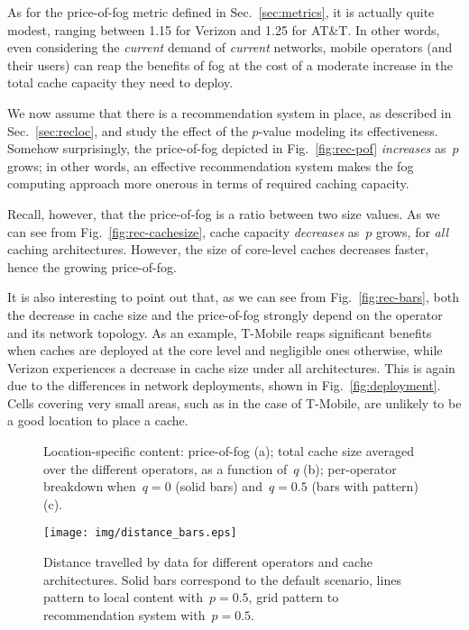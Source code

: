 \documentclass{sig-alternate-05-2015}
\newcommand{\Fig}[1]{Fig.~\ref{fig:#1}}
\newcommand{\Sec}[1]{Sec.~\ref{sec:#1}}
\begin{document}
As for the price-of-fog metric defined in \Sec{metrics}, it is actually quite modest, ranging between 1.15 for Verizon and 1.25 for AT\&T. In other words, even considering the {\em current} demand of {\em current} networks, mobile operators (and their users) can reap the benefits of fog at the cost of a moderate increase in the total cache capacity they need to deploy.

We now assume that there is a recommendation system in place, as described in \Sec{recloc}, and study the effect of the $p$-value modeling its effectiveness. Somehow surprisingly, the price-of-fog depicted in \Fig{rec-pof} {\em increases} as~$p$ grows; in other words, an effective recommendation system makes the fog computing approach more onerous in terms of required caching capacity.

Recall, however, that the price-of-fog is a ratio between two size values. As we can see from \Fig{rec-cachesize}, cache capacity {\em decreases} as~$p$ grows, for {\em all} caching architectures. However, the size of core-level caches decreases faster, hence the growing price-of-fog.

It is also interesting to point out that, as we can see from \Fig{rec-bars}, both the decrease in cache size and the price-of-fog strongly depend on the operator and its network topology. As an example, T-Mobile reaps significant benefits when caches are deployed at the core level and negligible ones otherwise, while Verizon experiences a decrease in cache size under all architectures.
This is again due to the differences in network deployments, shown in \Fig{deployment}. Cells covering very small areas, such as in the case of T-Mobile, are unlikely to be a good location to place a cache.

\begin{figure*}[]
\centering
{}   \caption{Location-specific content: price-of-fog (a); total cache size averaged
over the different operators, as a function of~$q$ (b); per-operator breakdown when~$q=0$ (solid bars) and~$q=0.5$ (bars with pattern) (c).
\vspace*{-3mm}
} \end{figure*}

\begin{figure}[]
\centering
\texttt{[image: img/distance\_bars.eps]}
\caption{
Distance travelled by data for different operators and cache architectures. Solid bars correspond to the default scenario, lines pattern to local content with~$p=0.5$, grid pattern to recommendation system with~$p=0.5$.
\label{fig:distance}
\vspace{-6mm}
} \end{figure}
\end{document}
